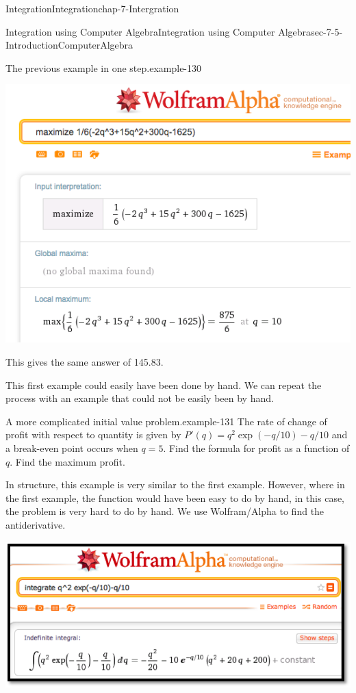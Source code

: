 \documentclass[oneside,10pt,]{book}
\numberwithin{equation}{section}
\begin{document}
\begin{chapterptx}{Integration}{}{Integration}{}{}{chap-7-Intergration}
\begin{sectionptx}{Integration using Computer Algebra}{}{Integration using Computer Algebra}{}{}{sec-7-5-IntroductionComputerAlgebra}
\begin{example}{The previous example in one step.}{example-130}
\begin{sidebyside}{1}{0.05}{0.05}{0}
\begin{sbspanel}{0.9}
\includegraphics[width=1\linewidth]{images/sec7-5-19.png}
\end{sbspanel}%
\end{sidebyside}%
\par
\hypertarget{p-2906}{}%
This gives the same answer of \textdollar{}145.83.%
\end{example}
\hypertarget{p-2907}{}%
This first example could easily have been done by hand.  We can repeat the process with an example that could not be easily been by hand.%
\begin{example}{A more complicated initial value problem.}{example-131}%
\hypertarget{p-2908}{}%
The rate of change of profit with respect to quantity is given by \(P' (q)=q^2  \exp(-q/10)-q/10\) and a break-even point occurs when \(q = 5\).  Find the formula for profit as a function of \(q\).  Find the maximum profit.%
\par
\hypertarget{p-2909}{}%
In structure, this example is very similar to the first example.  However, where in the first example, the function would have been easy to do by hand, in this case, the problem is very hard to do by hand.  We use Wolfram\slash{}Alpha to find the antiderivative.%
\begin{sidebyside}{1}{0.15}{0.15}{0}%
\begin{sbspanel}{0.7}%
\includegraphics[width=1\linewidth]{images/sec7-5-20.png}

\end{sbspanel}
\end{sidebyside}
\end{example}
\end{sectionptx}
\end{chapterptx}
\end{document}
